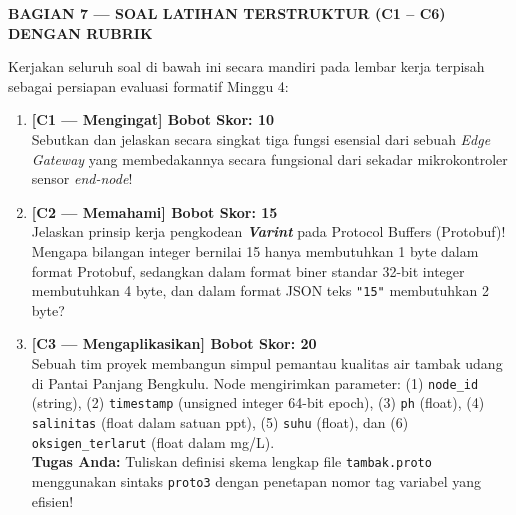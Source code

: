 \documentclass[11pt,a4paper]{article}
\newcommand{\secbanner}[2]{%
    \vspace{8pt}%
    \noindent\colorbox{unibnavy}{%
        \parbox{\dimexpr\textwidth-2\fboxsep\relax}{%
            \vspace{4pt}\textbf{\large\color{white}#1 --- #2}\vspace{4pt}%
        }%
    }%
    \vspace{4pt}%
}
\begin{document}
\secbanner{BAGIAN 7}{SOAL LATIHAN TERSTRUKTUR (C1 -- C6) DENGAN RUBRIK}

Kerjakan seluruh soal di bawah ini secara mandiri pada lembar kerja terpisah sebagai persiapan evaluasi formatif Minggu 4:

\begin{enumerate}
    \item \textbf{[C1 --- Mengingat] Bobot Skor: 10}\\
    Sebutkan dan jelaskan secara singkat tiga fungsi esensial dari sebuah \textit{Edge Gateway} yang membedakannya secara fungsional dari sekadar mikrokontroler sensor \textit{end-node}!

    \item \textbf{[C2 --- Memahami] Bobot Skor: 15}\\
    Jelaskan prinsip kerja pengkodean \textbf{\textit{Varint}} pada Protocol Buffers (Protobuf)! Mengapa bilangan integer bernilai 15 hanya membutuhkan 1 byte dalam format Protobuf, sedangkan dalam format biner standar 32-bit integer membutuhkan 4 byte, dan dalam format JSON teks \texttt{"15"} membutuhkan 2 byte?

    \item \textbf{[C3 --- Mengaplikasikan] Bobot Skor: 20}\\
    Sebuah tim proyek membangun simpul pemantau kualitas air tambak udang di Pantai Panjang Bengkulu. Node mengirimkan parameter: (1) \texttt{node\_id} (string), (2) \texttt{timestamp} (unsigned integer 64-bit epoch), (3) \texttt{ph} (float), (4) \texttt{salinitas} (float dalam satuan ppt), (5) \texttt{suhu} (float), dan (6) \texttt{oksigen\_terlarut} (float dalam mg/L).\\
    \textbf{Tugas Anda:} Tuliskan definisi skema lengkap file \texttt{tambak.proto} menggunakan sintaks \texttt{proto3} dengan penetapan nomor tag variabel yang efisien!


\end{enumerate}
\end{document}
